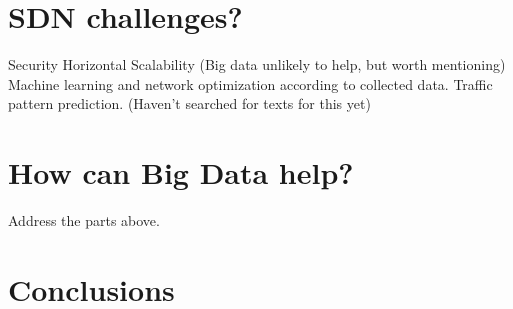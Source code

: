\documentclass{acm_proc_article-sp}
\begin{document}
\section{SDN challenges?}

Security \cite{Kreutz13}
Horizontal Scalability (Big data unlikely to help, but worth mentioning)
Machine learning and network optimization according to collected data. Traffic pattern prediction. (Haven't searched for texts for this yet)

\section{How can Big Data help?}

Address the parts above.

\section{Conclusions}



\end{document}
